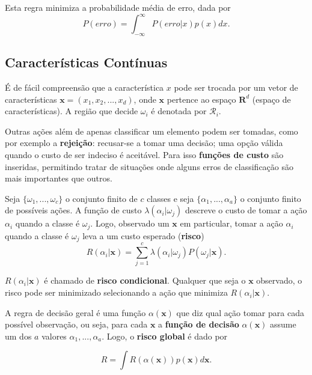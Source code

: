 \documentclass[a4paper,12pt,twocolumn]{article}
\begin{document}
Esta regra minimiza a probabilidade média de erro, dada por
\begin{equation}
    P(erro) = \int_{-\infty}^{\infty} P(erro|x)p(x) dx.
    \label{eq:bayes}
\end{equation}

\subsection{Características Contínuas}

É de fácil compreensão que a característica $x$ pode ser trocada por um vetor de características $\boldsymbol{x} = (x_1, x_2, ..., x_d)$, onde $\boldsymbol{x}$ pertence ao espaço $\boldsymbol{R}^d$ (espaço de características). A região que decide $\omega_i$ é denotada por $\mathcal{R}_i$.

Outras ações além de apenas classificar um elemento podem ser tomadas, como por exemplo a \textbf{rejeição}: recusar-se a tomar uma decisão; uma opção válida quando o custo de ser indeciso é aceitável. Para isso \textbf{funções de custo} são inseridas, permitindo tratar de situações onde alguns erros de classificação são mais importantes que outros.

Seja $\{\omega_1, ..., \omega_c\}$ o conjunto finito de $c$ classes e seja $\{\alpha_1, ..., \alpha_a\}$ o conjunto finito de possíveis ações. A função de custo $\lambda(\alpha_i|\omega_j)$ descreve o custo de tomar a ação $\alpha_i$ quando a classe é $\omega_j$. Logo, observado um $\boldsymbol{x}$ em particular, tomar a ação $\alpha_i$ quando a classe é $\omega_j$ leva a um custo esperado (\textbf{risco})
\begin{equation}
    R(\alpha_i|\boldsymbol{x}) = \sum_{j=1}^c \lambda(\alpha_i|\omega_j) P(\omega_j|\boldsymbol{x}).
    \label{eq:conditional_risk}
\end{equation}

$R(\alpha_i|\boldsymbol{x})$ é chamado de \textbf{risco condicional}. Qualquer que seja o $\boldsymbol{x}$ observado, o risco pode ser minimizado selecionando a ação que minimiza $R(\alpha_i|\boldsymbol{x})$.

A regra de decisão geral é uma função $\alpha(\boldsymbol{x})$ que diz qual ação tomar para cada possível observação, ou seja, para cada $\boldsymbol{x}$ a \textbf{função de decisão} $\alpha(\boldsymbol{x})$ assume um dos $a$ valores $\alpha_1, ..., \alpha_a$. Logo, o \textbf{risco global} é dado por

\begin{equation}
    R = \int R(\alpha(\boldsymbol{x}))p(\boldsymbol{x})d\boldsymbol{x}.
    \label{eq:conditional_risk}
\end{equation}
\end{document}
